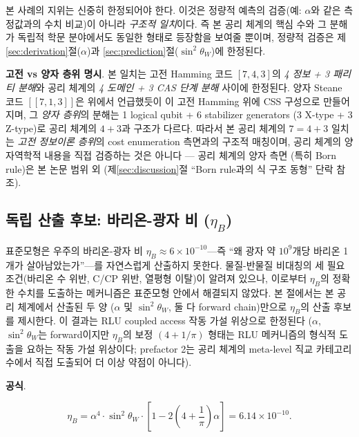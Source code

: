 \documentclass[entropy,article,submit,pdftex,oneauthor]{Definitions/mdpi}
\begin{document}
본 사례의 지위는 신중히 한정되어야 한다. 이것은 정량적 예측의 검증(예: $\alpha$와 같은 측정값과의 수치 비교)이 아니라 \emph{구조적 일치}이다. 즉 본 공리 체계의 핵심 수와 그 분해가 독립적 학문 분야에서도 동일한 형태로 등장함을 보여줄 뿐이며, 정량적 검증은 제\ref{sec:derivation}절($\alpha$)과 \ref{sec:prediction}절($\sin^2\theta_W$)에 한정된다.

\textbf{고전 vs 양자 층위 명시}. 본 일치는 고전 Hamming 코드 $[7,4,3]$의 \emph{4 정보 + 3 패리티 분해}와 공리 체계의 \emph{4 도메인 + 3 CAS 단계 분해} 사이에 한정된다. 양자 Steane 코드 $[[7,1,3]]$은 위에서 언급했듯이 이 고전 Hamming 위에 CSS 구성으로 만들어지며, 그 \emph{양자 층위}의 분해는 1 logical qubit + 6 stabilizer generators (3 X-type + 3 Z-type)로 공리 체계의 $4+3$과 구조가 다르다. 따라서 본 공리 체계의 $7 = 4+3$ 일치는 \emph{고전 정보이론 층위}의 cost enumeration 측면과의 구조적 매칭이며, 공리 체계의 양자역학적 내용을 직접 검증하는 것은 아니다 --- 공리 체계의 양자 측면 (특히 Born rule)은 본 논문 범위 외 (제\ref{sec:discussion}절 ``Born rule과의 식 구조 동형'' 단락 참조).


\subsection{독립 산출 후보: 바리온-광자 비 ($\eta_B$)}
\label{sec:baryogenesis}

표준모형은 우주의 바리온-광자 비 $\eta_B \approx 6 \times 10^{-10}$---즉 ``왜 광자 약 $10^9$개당 바리온 1개가 살아남았는가''---를 자연스럽게 산출하지 못한다. 물질-반물질 비대칭의 세 필요 조건(바리온 수 위반, C/CP 위반, 열평형 이탈)이 알려져 있으나, 이로부터 $\eta_B$의 정확한 수치를 도출하는 메커니즘은 표준모형 안에서 해결되지 않았다. 본 절에서는 본 공리 체계에서 산출된 두 양 ($\alpha$ 및 $\sin^2\theta_W$, 둘 다 forward chain)만으로 $\eta_B$의 산출 후보를 제시한다. 이 결과는 RLU coupled access 작동 가설 위상으로 한정된다 ($\alpha$, $\sin^2\theta_W$는 forward이지만 $\eta_B$의 보정 $(4+1/\pi)$ 형태는 RLU 메커니즘의 형식적 도출을 요하는 작동 가설 위상이다; prefactor 2는 공리 체계의 meta-level 직교 카테고리 수에서 직접 도출되어 더 이상 약점이 아니다).

\textbf{공식}.
\begin{linenomath}
\begin{equation}
\eta_B = \alpha^4 \cdot \sin^2\theta_W \cdot \left[ 1 - 2\!\left(4 + \frac{1}{\pi}\right)\alpha \right] = 6.14 \times 10^{-10}.
\label{eq:eta-B}
\end{equation}
\end{linenomath}
\end{document}
